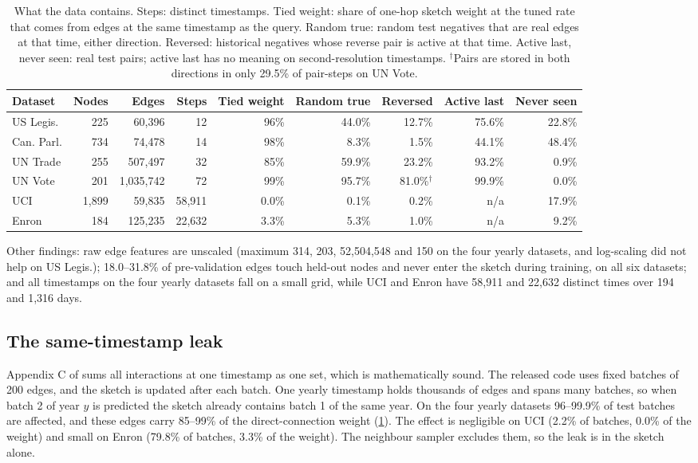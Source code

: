 \documentclass[11pt,a4paper]{article}
\theoremstyle{remark}
\begin{document}
\begin{table}[h]\centering\small\setlength{\tabcolsep}{4pt}
\begin{tabular}{lrrrrrrrr}
\toprule
Dataset & Nodes & Edges & Steps & Tied weight & Random true & Reversed & Active last & Never seen\\
\midrule
US Legis. & 225 & 60,396 & 12 & 96\% & 44.0\% & 12.7\% & 75.6\% & 22.8\%\\
Can. Parl. & 734 & 74,478 & 14 & 98\% & 8.3\% & 1.5\% & 44.1\% & 48.4\%\\
UN Trade & 255 & 507,497 & 32 & 85\% & 59.9\% & 23.2\% & 93.2\% & 0.9\%\\
UN Vote & 201 & 1,035,742 & 72 & 99\% & 95.7\% & 81.0\%$^\dagger$ & 99.9\% & 0.0\%\\
UCI & 1,899 & 59,835 & 58,911 & 0.0\% & 0.1\% & 0.2\% & n/a & 17.9\%\\
Enron & 184 & 125,235 & 22,632 & 3.3\% & 5.3\% & 1.0\% & n/a & 9.2\%\\
\bottomrule
\end{tabular}
\caption{What the data contains. Steps: distinct timestamps. Tied weight: share of one-hop sketch weight at the tuned rate that comes from edges at the same timestamp as the query. Random true: random test negatives that are real edges at that time, either direction. Reversed: historical negatives whose reverse pair is active at that time. Active last, never seen: real test pairs; active last has no meaning on second-resolution timestamps. $^\dagger$Pairs are stored in both directions in only 29.5\% of pair-steps on UN Vote.}\label{tab:data}
\end{table}

Other findings: raw edge features are unscaled (maximum 314, 203, 52,504,548 and 150 on the four yearly datasets, and log-scaling did not help on US Legis.); 18.0--31.8\% of pre-validation edges touch held-out nodes and never enter the sketch during training, on all six datasets; and all timestamps on the four yearly datasets fall on a small grid, while UCI and Enron have 58,911 and 22,632 distinct times over 194 and 1,316 days.

\subsection{The same-timestamp leak}\label{sec:strict}
Appendix C of \cite{tpnet} sums all interactions at one timestamp as one set, which is mathematically sound. The released code uses fixed batches of 200 edges, and the sketch is updated after each batch. One yearly timestamp holds thousands of edges and spans many batches, so when batch 2 of year $y$ is predicted the sketch already contains batch 1 of the same year. On the four yearly datasets 96--99.9\% of test batches are affected, and these edges carry 85--99\% of the direct-connection weight (\cref{tab:data}). The effect is negligible on UCI (2.2\% of batches, 0.0\% of the weight) and small on Enron (79.8\% of batches, 3.3\% of the weight). The neighbour sampler excludes them, so the leak is in the sketch alone.
\end{document}
